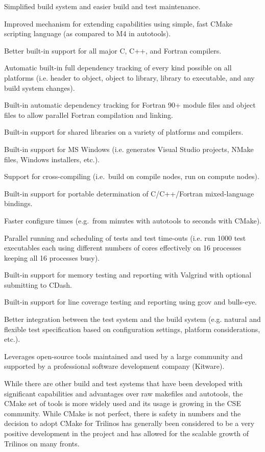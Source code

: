 \documentclass[note]{TechNote}
\begin{document}
\begin{compactitem}
\item Simplified build system and easier build and test maintenance.
\item Improved mechanism for extending capabilities using simple, fast CMake scripting language (as compared to M4 in autotools).
\item Better built-in support for all major C, C++, and Fortran compilers.
\item Automatic built-in full dependency tracking of every kind possible on all platforms (i.e. header to object, object to library, library to executable, and any build system changes).
\item Built-in automatic dependency tracking for Fortran 90+ module files and object files to allow parallel Fortran compilation and linking.
\item Built-in support for shared libraries on a variety of platforms and compilers.
\item Built-in support for MS Windows (i.e. generates Visual Studio projects, NMake files, Windows installers, etc.).
\item Support for cross-compiling (i.e.\ build on compile nodes, run on compute nodes).
\item Built-in support for portable determination of C/C++/Fortran mixed-language bindings.
\item Faster configure times (e.g.\ from minutes with autotools to seconds with CMake).
\item Parallel running and scheduling of tests and test time-outs (i.e. run 1000 test executables each using different numbers of cores effectively on 16 processes keeping all 16 processes busy).
\item Built-in support for memory testing and reporting with Valgrind with optional submitting to CDash.
\item Built-in support for line coverage testing and reporting using gcov and bulls-eye.
\item Better integration between the test system and the build system (e.g. natural and flexible test specification based on configuration settings, platform considerations, etc.).
\item Leverages open-source tools maintained and used by a large community and supported by a professional software development company (Kitware).
\end{compactitem}

While there are other build and test systems that have been developed with significant capabilities and advantages over raw makefiles and autotools, the CMake set of tools is more widely used and its usage is growing in the CSE community.  While CMake is not perfect, there is safety in numbers and the decision to adopt CMake for Trilinos has generally been considered to be a very positive development in the project and has allowed for the scalable growth of Trilinos on many fronts.
\end{document}
